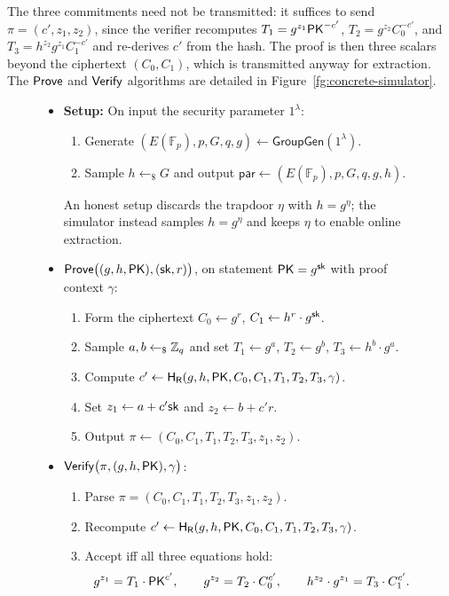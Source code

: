 The three commitments need not be transmitted: it suffices to send $\pi = (c', z_1, z_2)$, since the verifier
recomputes $T_1 = g^{z_1}\mathsf{PK}^{-c'}$, $T_2 = g^{z_2}C_0^{-c'}$, and $T_3 = h^{z_2}g^{z_1}C_1^{-c'}$ and
re-derives $c'$ from the hash. The proof is then three scalars beyond the ciphertext $(C_0, C_1)$, which is
transmitted anyway for extraction. The $\mathsf{Prove}$ and $\mathsf{Verify}$ algorithms are detailed in
Figure~\ref{fg:concrete-simulator}.

\begin{figure}[H]
  \begin{framed}
    \begin{center}

\begin{itemize}
\item \textbf{Setup:} On input the security parameter $1^\lambda$:
\begin{enumerate}
    \item Generate $(E(\mathbb{F}_p), p, G, q, g) \leftarrow \mathsf{GroupGen}(1^\lambda)$.
    \item Sample $h \leftarrow_{\$} G$ and output $\mathsf{par} \leftarrow (E(\mathbb{F}_p), p, G, q, g, h)$.
\end{enumerate}
An honest setup discards the trapdoor $\eta$ with $h = g^{\eta}$; the simulator instead samples
$h = g^{\eta}$ and keeps $\eta$ to enable online extraction.

\item $\mathsf{Prove}\big((g, h, \mathsf{PK}), (\mathsf{sk}, r)\big)$, on statement $\mathsf{PK} = g^{\mathsf{sk}}$ with proof context $\gamma$:
\begin{enumerate}
    \item Form the ciphertext $C_0 \gets g^{r}$, $C_1 \gets h^{r}\cdot g^{\mathsf{sk}}$.
    \item Sample $a, b \leftarrow_{\$} \mathbb{Z}_q$ and set $T_1 \gets g^{a}$, $T_2 \gets g^{b}$, $T_3 \gets h^{b}\cdot g^{a}$.
    \item Compute $c' \gets \mathsf{H_{\mathsf{R}}}(g, h, \mathsf{PK}, C_0, C_1, T_1, T_2, T_3, \gamma)$.
    \item Set $z_1 \gets a + c'\mathsf{sk}$ and $z_2 \gets b + c' r$.
    \item Output $\pi \gets (C_0, C_1, T_1, T_2, T_3, z_1, z_2)$.
\end{enumerate}

\item $\mathsf{Verify}\big(\pi, (g, h, \mathsf{PK}), \gamma\big)$:
\begin{enumerate}
    \item Parse $\pi = (C_0, C_1, T_1, T_2, T_3, z_1, z_2)$.
    \item Recompute $c' \gets \mathsf{H_{\mathsf{R}}}(g, h, \mathsf{PK}, C_0, C_1, T_1, T_2, T_3, \gamma)$.
    \item Accept iff all three equations hold:
    \[
      g^{z_1} = T_1 \cdot \mathsf{PK}^{c'}, \qquad
      g^{z_2} = T_2 \cdot C_0^{c'}, \qquad
      h^{z_2}\cdot g^{z_1} = T_3 \cdot C_1^{c'}.
    \]
\end{enumerate}
\end{itemize}


\end{center}
\end{framed}
\end{figure}

